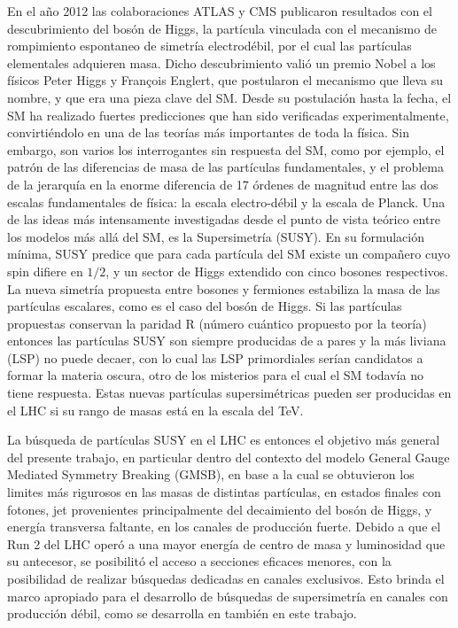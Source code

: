 En el año 2012 las colaboraciones ATLAS y CMS publicaron resultados con el descubrimiento del bosón de Higgs, la partícula vinculada con el mecanismo de rompimiento espontaneo de simetría electrodébil, por el cual las partículas elementales adquieren masa. Dicho descubrimiento valió un premio Nobel a los físicos Peter Higgs y François Englert, que postularon el mecanismo que lleva su nombre, y que era una pieza clave del SM. Desde su postulación hasta la fecha, el SM ha realizado fuertes predicciones que han sido verificadas experimentalmente, convirtiéndolo en una de las teorías más importantes de toda la física. Sin embargo, son varios los interrogantes sin respuesta del 
SM, como por ejemplo, el patrón de las diferencias de masa de las partículas fundamentales, y el problema de la jerarquía en la enorme diferencia de 17 órdenes de magnitud entre las dos escalas fundamentales de física: la escala electro-débil y la escala de Planck. Una de las ideas más intensamente investigadas desde el punto de vista teórico entre los modelos más allá del SM, es la Supersimetría (SUSY). En su formulación mínima, SUSY predice que para cada partícula del SM existe un compañero cuyo spin difiere en $1/2$, y un sector de Higgs extendido con cinco bosones respectivos. La nueva simetría propuesta entre bosones y fermiones estabiliza la masa de las partículas escalares, como es el caso del bosón de Higgs. Si las partículas propuestas conservan la paridad R (número cuántico propuesto por la teoría) entonces las partículas SUSY son siempre producidas de a pares y la más liviana (LSP) no puede decaer, con lo cual las LSP primordiales serían candidatos a formar la materia oscura, otro de los misterios para el cual el SM todavía no tiene respuesta. Estas nuevas partículas supersimétricas pueden ser producidas en el LHC si su rango de masas está en la escala del TeV. 

La búsqueda de partículas SUSY en el LHC es entonces el objetivo más general del presente trabajo, en particular dentro del contexto del modelo General Gauge Mediated Symmetry Breaking (GMSB), en base a la cual se obtuvieron los limites más rigurosos en las masas de distintas partículas, en estados finales con fotones, jet provenientes principalmente del decaimiento del bosón de Higgs, y energía transversa faltante, en los canales de producción fuerte. Debido a que el Run 2 del LHC operó a una mayor energía de centro de masa y luminosidad que su antecesor, se posibilitó el acceso a secciones eficaces menores, con la posibilidad de realizar búsquedas dedicadas en canales exclusivos. Esto brinda el marco apropiado para el desarrollo de búsquedas de supersimetría en canales con producción débil, como se desarrolla en también en este trabajo. 

